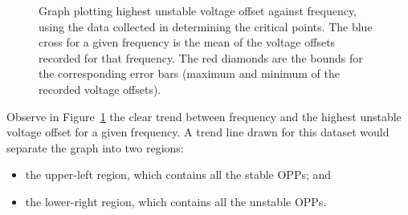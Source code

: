 \begin{figure}[!htb]
    \caption{
        \label{fig:critical-points-graph}
        Graph plotting highest unstable voltage offset against frequency, using
        the data collected in determining the critical points. The blue cross
        for a given frequency is the mean of the voltage offsets recorded for
        that frequency. The red diamonds are the bounds for the corresponding
        error bars (maximum and minimum of the recorded voltage offsets).
    }
\end{figure}

Observe in Figure~\ref{fig:critical-points-graph} the clear trend between
frequency and the highest unstable voltage offset for a given frequency.
A trend line drawn for this dataset would separate the graph into two regions:

\begin{itemize}
    \item the upper-left region, which contains all the stable OPPs; and
    \item the lower-right region, which contains all the unstable OPPs.
\end{itemize}
